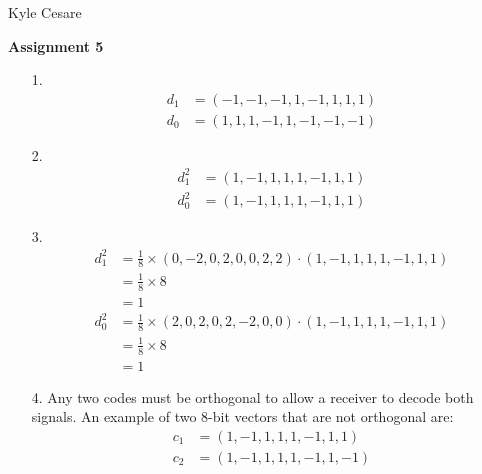 \documentclass[11pt]{article}
\begin{document}
\begin{flushright}
  Kyle Cesare
\end{flushright}

{\center \textbf{Assignment 5} \\}

\begin{itemize}
  \item[1.]
    \begin{align*}
      d_1 &= (-1, -1, -1, 1, -1, 1, 1, 1) \\
      d_0 &= (1, 1, 1, -1, 1, -1, -1, -1)
    \end{align*}

  \item[2.]
    \begin{align*}
      d^2_1 &= (1, -1, 1, 1, 1, -1, 1, 1) \\
      d^2_0 &= (1, -1, 1, 1, 1, -1, 1, 1)
    \end{align*}

  \item[3.]
    \begin{align*}
      d^2_1 &= \frac{1}{8} \times (0, -2, 0, 2, 0, 0, 2, 2)
        \cdot (1, -1, 1, 1, 1, -1, 1, 1) \\
            &= \frac{1}{8} \times 8 \\
            &= 1 \\
      d^2_0 &= \frac{1}{8} \times (2, 0, 2, 0, 2, -2, 0, 0)
        \cdot (1, -1, 1, 1, 1, -1, 1, 1) \\
            &= \frac{1}{8} \times 8 \\
            &= 1
    \end{align*}

  \item[4.] Any two codes must be orthogonal to allow a receiver to decode both
    signals.  An example of two 8-bit vectors that are not orthogonal are:
    \begin{align*}
      c_1 &= (1, -1, 1, 1, 1, -1, 1, 1) \\
      c_2 &= (1, -1, 1, 1, 1, -1, 1, -1)
    \end{align*}


\end{itemize}
\end{document}
